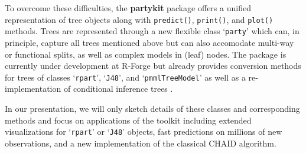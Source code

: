 \documentclass[10pt]{article}
\let\code=\texttt
\let\pkg=\textbf
\newcommand{\class}[1]{`\code{#1}'}
\begin{document}
To overcome these difficulties, the \pkg{partykit} package \citep{partykit:partykit} offers a 
unified representation of tree objects along with \code{predict()}, 
\code{print()}, and \code{plot()} methods. Trees are represented through 
a new flexible class \class{party} which can, in principle, capture
all trees mentioned above but can also accomodate multi-way or functional
splits, as well as complex models in (leaf) nodes. The package is currently
under development at R-Forge but already provides conversion methods for
trees of classes \class{rpart}, \class{J48}, and \class{pmmlTreeModel}
as well as a re-implementation of conditional inference trees \citep{partykit:Hothorn+Hornik+Zeileis:2006}.

In our presentation, we will only sketch details of these classes and 
corresponding methods and focus on applications of the toolkit including
extended visualizations for \class{rpart} or \class{J48} objects, fast predictions
on millions of new observations, and a new implementation of the classical CHAID
algorithm.



\end{document}
